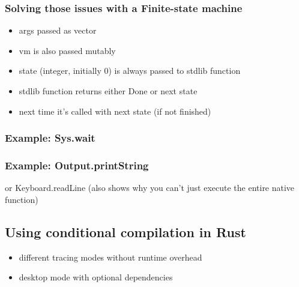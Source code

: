 \subsubsection{Solving those issues with a Finite-state machine}
\begin{itemize}
  \item args passed as vector
  \item vm is also passed mutably
  \item state (integer, initially 0) is always passed to stdlib function
  \item stdlib function returns either Done or next state
  \item next time it's called with next state (if not finished)
\end{itemize}
\subsubsection{Example: Sys.wait}
\subsubsection{Example: Output.printString}
or Keyboard.readLine (also shows why you can't just execute the entire native function)
\subsection{Using conditional compilation in Rust} \label{conditional-compilation}
\begin{itemize}
  \item different tracing modes without runtime overhead
  \item desktop mode with optional dependencies
\end{itemize}
